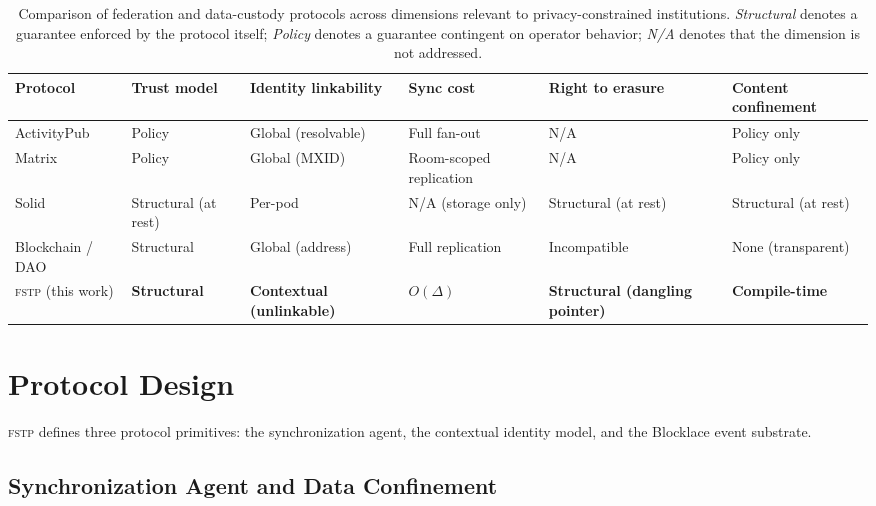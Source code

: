 \documentclass[12pt]{article}
\newcommand{\FSTP}{\textsc{fstp}}
\begin{document}
	\begin{table}[h]
		\centering
		\caption{Comparison of federation and data-custody protocols across
			dimensions relevant to privacy-constrained institutions.
			\textit{Structural} denotes a guarantee enforced by the protocol
			itself; \textit{Policy} denotes a guarantee contingent on operator
			behavior; \textit{N/A} denotes that the dimension is not addressed.}
		\label{tab:sota}
		\small
		\begin{tabularx}{\linewidth}{@{} l X X X X X @{}}
			\toprule
			\textbf{Protocol} &
			\textbf{Trust model} &
			\textbf{Identity linkability} &
			\textbf{Sync cost} &
			\textbf{Right to erasure} &
			\textbf{Content confinement} \\
			\midrule
			ActivityPub &
			Policy &
			Global (resolvable) &
			Full fan-out &
			N/A &
			Policy only \\
			\addlinespace[0.5ex]
			Matrix &
			Policy &
			Global (MXID) &
			Room-scoped replication &
			N/A &
			Policy only \\
			\addlinespace[0.5ex]
			Solid &
			Structural (at rest) &
			Per-pod &
			N/A (storage only) &
			Structural (at rest) &
			Structural (at rest) \\
			\addlinespace[0.5ex]
			Blockchain / DAO &
			Structural &
			Global (address) &
			Full replication &
			Incompatible &
			None (transparent) \\
			\addlinespace[0.5ex]
			\FSTP{} (this work) &
			\textbf{Structural} &
			\textbf{Contextual (unlinkable)} &
			\textbf{$O(\Delta)$} &
			\textbf{Structural (dangling pointer)} &
			\textbf{Compile-time} \\
			\bottomrule
		\end{tabularx}
	\end{table}
	
	
	\section{Protocol Design}
	\label{sec:design}
	
	\FSTP{} defines three protocol primitives: the synchronization agent,
	the contextual identity model, and the Blocklace event substrate.
	
	\subsection{Synchronization Agent and Data Confinement}
	\label{sec:sa}
	
\end{document}
